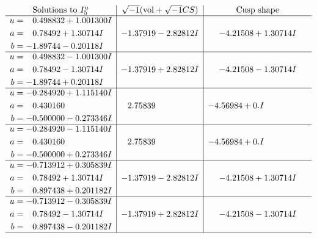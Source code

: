 \documentclass[1p]{elsarticle_modified}
\theoremstyle{definition}
\newcommand{\I}{\sqrt{-1}}
\begin{document}
$$\begin{array}{c|c|c}  
\text{Solutions to }I^u_{5}& \I (\text{vol} + \sqrt{-1}CS) & \text{Cusp shape}\\
 \hline 
\begin{aligned}
u &= \phantom{-}0.498832 + 1.001300 I \\
a &= \phantom{-}0.78492 + 1.30714 I \\
b &= -1.89744 - 0.20118 I\end{aligned}
 & -1.37919 - 2.82812 I & -4.21508 + 1.30714 I \\ \hline\begin{aligned}
u &= \phantom{-}0.498832 - 1.001300 I \\
a &= \phantom{-}0.78492 - 1.30714 I \\
b &= -1.89744 + 0.20118 I\end{aligned}
 & -1.37919 + 2.82812 I & -4.21508 - 1.30714 I \\ \hline\begin{aligned}
u &= -0.284920 + 1.115140 I \\
a &= \phantom{-}0.430160\phantom{ +0.000000I} \\
b &= -0.500000 - 0.273346 I\end{aligned}
 & \phantom{-}2.75839\phantom{ +0.000000I} & -4.56984 + 0. I\phantom{ +0.000000I} \\ \hline\begin{aligned}
u &= -0.284920 - 1.115140 I \\
a &= \phantom{-}0.430160\phantom{ +0.000000I} \\
b &= -0.500000 + 0.273346 I\end{aligned}
 & \phantom{-}2.75839\phantom{ +0.000000I} & -4.56984 + 0. I\phantom{ +0.000000I} \\ \hline\begin{aligned}
u &= -0.713912 + 0.305839 I \\
a &= \phantom{-}0.78492 + 1.30714 I \\
b &= \phantom{-}0.897438 + 0.201182 I\end{aligned}
 & -1.37919 - 2.82812 I & -4.21508 + 1.30714 I \\ \hline\begin{aligned}
u &= -0.713912 - 0.305839 I \\
a &= \phantom{-}0.78492 - 1.30714 I \\
b &= \phantom{-}0.897438 - 0.201182 I\end{aligned}
 & -1.37919 + 2.82812 I & -4.21508 - 1.30714 I\\
 \hline 
 \end{array}$$\newpage
\end{document}
